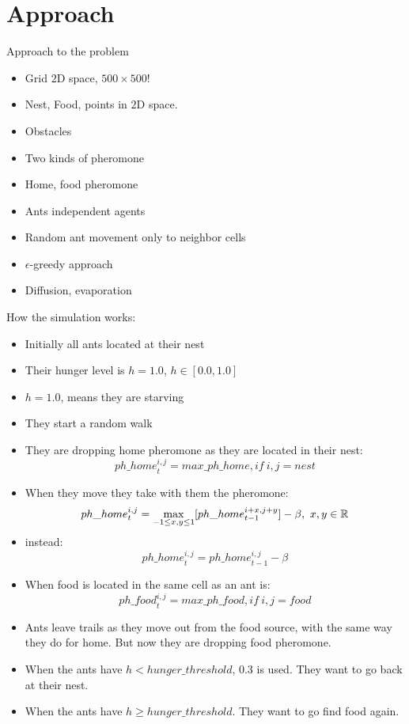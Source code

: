 \documentclass{beamer}
\begin{document}
\section{Approach}
\begin{frame}
Approach to the problem
\begin{itemize}
\item Grid $2$D space, $500 \times 500 !$
\item Nest, Food, points in $2$D space.
\item Obstacles
\item Two kinds of pheromone
\item Home, food pheromone
\item Ants independent agents
\item Random ant movement only to neighbor cells
\item $\epsilon$-greedy approach
\item Diffusion, evaporation
\end{itemize}
\end{frame}

\begin{frame}[allowframebreaks]
How the simulation works:
\begin{itemize}
\item Initially all ants located at their nest
\item Their hunger level is $h = 1.0$, $h \in [0.0,1.0]$
\item $h = 1.0$, means they are starving
\item They start a random walk
\item They are dropping home pheromone as they are located in their nest:
\begin{equation}
{ph\_{home}}_t^{i,j} = max\_ph\_home, if\ i,j = nest
\end{equation}
\item When they move they take with them the pheromone:
\begin{equation}
{ph\_{home}}_t^{i,j} = \smash{\displaystyle\max_{-1 \leq x,y \leq 1}}[{ph\_{home}}_{t-1}^{i+x,j+y}] - \beta,\ x,y \in \mathbb{R}
\end{equation}
\item instead:
\begin{equation}
{ph\_{home}}_t^{i,j} = {ph\_{home}}_{t-1}^{i,j} - \beta
\end{equation}
\item When food is located in the same cell as an ant is:
\begin{equation}
{ph\_{food}}_t^{i,j} = max\_ph\_food, if\ i,j = food
\end{equation}
\item Ants leave trails as they move out from the food source, with the same way they do for home. But now they are dropping food pheromone.
\item When the ants have $h < hunger\_threshold$, $0.3$ is used. They want to go back at their nest.
\item When the ants have $h \geq hunger\_threshold$. They want to go find food again.
\end{itemize}
\end{frame}
\end{document}
